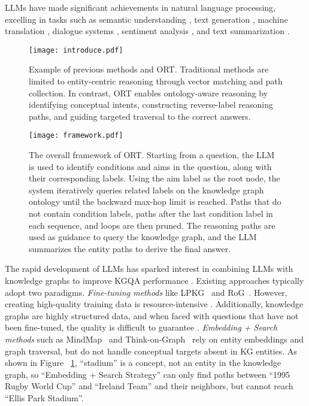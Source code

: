LLMs have made significant achievements in natural language processing, excelling in tasks such as semantic understanding \cite{Raiaan2024ARO}, text generation \cite{shen-etal-2024-heart}, machine translation \cite{hu-etal-2024-gentranslate}, dialogue systems \cite{Zhang2019DIALOGPTL}, sentiment analysis \cite{Devlin2019BERTPO}, and text summarization \cite{Basyal2023TextSU}. 

\begin{figure}[t]
  \centering
  \texttt{[image: introduce.pdf]}  %
  \caption{Example of previous methods and ORT. Traditional methods are limited to entity-centric reasoning through vector matching and path collection. In contrast, ORT enables ontology-aware reasoning by identifying conceptual intents, constructing reverse-label reasoning paths, and guiding targeted traversal to the correct answers.}  %
  \label{fig:introduce}  %
\end{figure}

\begin{figure*}[t]  %
  \centering
  \texttt{[image: framework.pdf]}  %
  \caption{The overall framework of ORT. Starting from a question, the LLM is used to identify conditions and aims in the question, along with their corresponding labels. Using the aim label as the root node, the system iteratively queries related labels on the knowledge graph ontology until the backward max-hop limit is reached. Paths that do not contain condition labels, paths after the last condition label in each sequence, and loops are then pruned. The reasoning paths are used as guidance to query the knowledge graph, and the LLM summarizes the entity paths to derive the final answer.}  %
  \label{fig:framework}  %
\end{figure*}

The rapid development of LLMs has sparked interest in combining LLMs with knowledge graphs to improve KGQA performance \cite{Hu2024GRAGGR}. Existing approaches typically adopt two paradigms. \textit{Fine-tuning methods} like LPKG~\cite{wang-etal-2024-learning-plan} and RoG~\cite{Luo2023ReasoningOG}. However, creating high-quality training data is resource-intensive \cite{Cao2023InstructionMI}. Additionally, knowledge graphs are highly structured data, and when faced with questions that have not been fine-tuned, the quality is difficult to guarantee \cite{Jiang2024KGFITKG}. \textit{Embedding + Search methods} such as MindMap~\cite{wen-etal-2024-mindmap} and Think-on-Graph~\cite{Sun2023ThinkonGraphDA} rely on entity embeddings and graph traversal, but do not handle conceptual targets absent in KG entities. As shown in Figure ~\ref{fig:introduce}, ``stadium'' is a concept, not an entity in the knowledge graph, so ``Embedding + Search Strategy'' can only find paths between ``1995 Rugby World Cup'' and ``Ireland Team'' and their neighbors, but cannot reach ``Ellis Park Stadium''.

